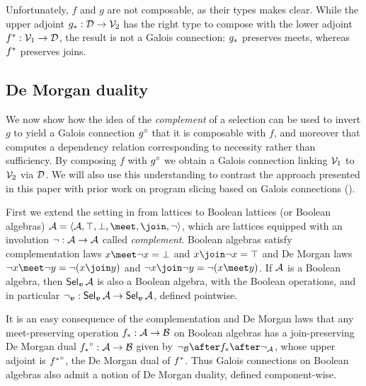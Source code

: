 \noindent Unfortunately, $f$ and $g$ are not composable, as their types makes clear. While the upper adjoint ${g}_*: \mathcal{D} \to \mathcal{V}_2$ has the right type to compose with the lower adjoint ${f}^*: \mathcal{V}_1 \to \mathcal{D}$, the result is not a Galois connection: ${g}_*$ preserves meets, whereas ${f}^*$ preserves joins.

\subsection{De Morgan duality}
\label{sec:toolkit:de-morgan-duality}

We now show how the idea of the \emph{complement} of a selection can be used to invert $g$ to yield a Galois connection ${g}^{\circ}$ that it is composable with $f$, and moreover that computes a dependency relation corresponding to necessity rather than sufficiency. By composing $f$ with ${g}^{\circ}$ we obtain a Galois connection linking $\mathcal{V}_1$ to $\mathcal{V}_2$ via $\mathcal{D}$. We will also use this understanding to contrast the approach presented in this paper with prior work on program slicing based on Galois connections ().

First we extend the setting in  from lattices to Boolean lattices (or Boolean algebras) $\Ann{A}= \BoolLattice{\Ann{A}}{\top}{\bot}{\meet}{\join}{\neg}$, which are lattices equipped with an involution $\neg: \mathcal{A} \to \mathcal{A}$ called \emph{complement}. Boolean algebras satisfy complementation laws $x \meet \neg x = \bot$ and $x \join \neg x = \top$ and De Morgan laws $\neg x \meet \neg y = \neg(x \join y)$ and $\neg x \join \neg y = \neg(x \meet y)$. If $\mathcal{A}$ is a Boolean algebra, then $\textup{\textsf{Sel}}_{\bm{v}}\,{\mathcal{A}}$ is also a Boolean algebra, with the Boolean operations, and in particular $\neg_{\bm{v}}: \textup{\textsf{Sel}}_{\bm{v}}\,{\mathcal{A}} \to \textup{\textsf{Sel}}_{\bm{v}}\,{\mathcal{A}}$, defined pointwise.



It is an easy consequence of the complementation and De Morgan laws that any meet-preserving operation ${f}_*: \mathcal{A} \to \mathcal{B}$ on Boolean algebras has a join-preserving De Morgan dual ${{f}_*}^{\circ}: \mathcal{A} \to \mathcal{B}$ given by $\neg_{\Ann{B}} \after \upperAdj{f} \after \neg_{\Ann{A}}$, whose upper adjoint is ${{f}^*}^{\circ}$, the De Morgan dual of ${f}^*$. Thus Galois connections on Boolean algebras also admit a notion of De Morgan duality, defined component-wise.

